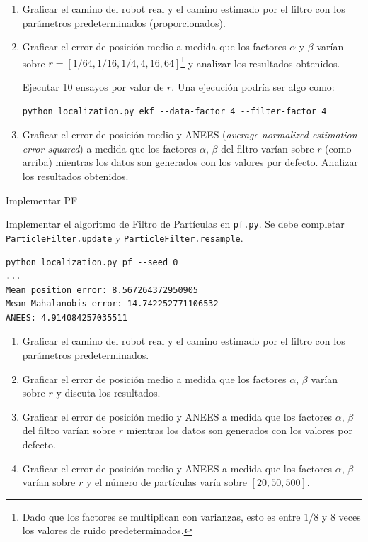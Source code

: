 \documentclass[tp]{lcc}
\begin{document}
	\begin{enumerate}
		\item Graficar el camino del robot real y el camino estimado por el filtro con los parámetros predeterminados (proporcionados).
		\item  Graficar el error de posición medio a medida que los factores $\alpha$ y $\beta$ varían sobre $r = [1/64, 1/16, 1/4, 4, 16, 64]$\footnote{Dado que los factores se multiplican con varianzas, esto es entre 1/8 y 8 veces los valores de ruido predeterminados.} y analizar los resultados obtenidos.
		
		Ejecutar 10 ensayos por valor de $r$. Una ejecución podría ser algo como:

\begin{lstlisting}[style=bash] 
python localization.py ekf --data-factor 4 --filter-factor 4
\end{lstlisting}

		\item Graficar el error de posición medio y ANEES (\emph{average normalized estimation error squared}) a medida que los factores $\alpha$, $\beta$ del filtro varían sobre $r$ (como arriba) mientras los datos son generados con los valores por defecto. Analizar los resultados obtenidos.
	\end{enumerate}


	\ejercicio Implementar PF
	
	Implementar el algoritmo de Filtro de Partículas en \lstinline[style=bash]{pf.py}. Se debe completar \lstinline[style=bash]{ParticleFilter.update} y \lstinline[style=bash]{ParticleFilter.resample}.

\begin{lstlisting}[style=bash] 
python localization.py pf --seed 0
...
Mean position error: 8.567264372950905
Mean Mahalanobis error: 14.742252771106532
ANEES: 4.914084257035511
\end{lstlisting}

	\begin{enumerate}
		\item Graficar el camino del robot real y el camino estimado por el filtro con los parámetros predeterminados.
		\item Graficar el error de posición medio a medida que los factores $\alpha$, $\beta$ varían sobre $r$ y discuta los resultados.
		\item Graficar el error de posición medio y ANEES a medida que los factores $\alpha$, $\beta$ del filtro varían sobre $r$ mientras los datos son generados con los valores por defecto.
		\item Graficar el error de posición medio y ANEES a medida que los factores $\alpha$, $\beta$ varían sobre $r$ y el número de partículas varía sobre $[20, 50, 500]$.
	\end{enumerate}


	\printbibliography
	
\end{document}
